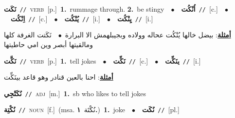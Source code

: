 \documentclass[10pt,a4paper,twoside]{article} %
\begin{document}
\begin{multicols}{2}
{\setlength\topsep{0pt}\textbf{\foreignlanguage{arabic}{نَكَت}}\ {\color{gray}\texttt{//}\color{black}}\ \textsc{verb}\ [p.]\ \textbf{1.}~rummage through.  \textbf{2.}~be stingy\ \ $\bullet$\ \ \setlength\topsep{0pt}\textbf{\foreignlanguage{arabic}{اُنْكُت}}\ {\color{gray}\texttt{//}\color{black}}\ [c.]\ \ $\bullet$\ \ \setlength\topsep{0pt}\textbf{\foreignlanguage{arabic}{اِنْكُت}}\ {\color{gray}\texttt{//}\color{black}}\ [c.]\ \ $\bullet$\ \ \setlength\topsep{0pt}\textbf{\foreignlanguage{arabic}{يُنْكُت}}\ {\color{gray}\texttt{//}\color{black}}\ [i.]\ \ $\bullet$\ \ \setlength\topsep{0pt}\textbf{\foreignlanguage{arabic}{يِنْكُت}}\ {\color{gray}\texttt{//}\color{black}}\ [i.]\  \begin{flushright}\color{gray}\foreignlanguage{arabic}{\textbf{\underline{\foreignlanguage{arabic}{أمثلة}}}: بيضل خالها يُنْكُت عحاله وولاده وبجيبلهمش الا البرارة\ $\bullet$\ \  نَكَتت الغرفة كلها ومالقيتها أبصر وين امي حاطيتها}\end{flushright}\color{black}} \vspace{2mm}

{\setlength\topsep{0pt}\textbf{\foreignlanguage{arabic}{نَكَّت}}\ {\color{gray}\texttt{//}\color{black}}\ \textsc{verb}\ [p.]\ \textbf{1.}~tell jokes\ \ $\bullet$\ \ \setlength\topsep{0pt}\textbf{\foreignlanguage{arabic}{نَكِّت}}\ {\color{gray}\texttt{//}\color{black}}\ [c.]\ \ $\bullet$\ \ \setlength\topsep{0pt}\textbf{\foreignlanguage{arabic}{ينَكِّت}}\ {\color{gray}\texttt{//}\color{black}}\ [i.]\  \begin{flushright}\color{gray}\foreignlanguage{arabic}{\textbf{\underline{\foreignlanguage{arabic}{أمثلة}}}: احنا بالعين قنادر وهو قاعد بينَكِّت}\end{flushright}\color{black}} \vspace{2mm}

{\setlength\topsep{0pt}\textbf{\foreignlanguage{arabic}{نُكَتْجِي}}\ {\color{gray}\texttt{//}\color{black}}\ \textsc{adj}\ [m.]\ \textbf{1.}~sb who likes to tell jokes\ } \vspace{2mm}

{\setlength\topsep{0pt}\textbf{\foreignlanguage{arabic}{نُكْتِة}}\ {\color{gray}\texttt{//}\color{black}}\ \textsc{noun}\ [f.]\ \color{gray}(msa. \foreignlanguage{arabic}{نُكْتَة}~\foreignlanguage{arabic}{\textbf{١.}})\color{black}\ \textbf{1.}~joke\ \ $\bullet$\ \ \setlength\topsep{0pt}\textbf{\foreignlanguage{arabic}{نُكَت}}\ {\color{gray}\texttt{//}\color{black}}\ [pl.]\ } \vspace{2mm}


\end{multicols}
\end{document}

